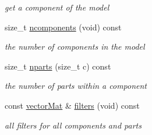 \begin{DoxyCompactItemize}
\begin{DoxyCompactList}\small\item\em get a component of the model \end{DoxyCompactList}\item 
size\-\_\-t \hyperlink{class_parts_a88ecd6a5e7e745e89c53f95f1593c600}{ncomponents} (void) const 
\begin{DoxyCompactList}\small\item\em the number of components in the model \end{DoxyCompactList}\item 
size\-\_\-t \hyperlink{class_parts_a77d8b38212220cd8779736205388b48f}{nparts} (size\-\_\-t c) const 
\begin{DoxyCompactList}\small\item\em the number of parts within a component \end{DoxyCompactList}\item 
const \hyperlink{types_8hpp_a3207a7addcfa415d1c83622febcb1e9b}{vector\-Mat} \& \hyperlink{class_parts_af3e4755656bcd59221ec3b91a79c0201}{filters} (void) const 
\begin{DoxyCompactList}\small\item\em all filters for all components and parts \end{DoxyCompactList}\end{DoxyCompactItemize}
